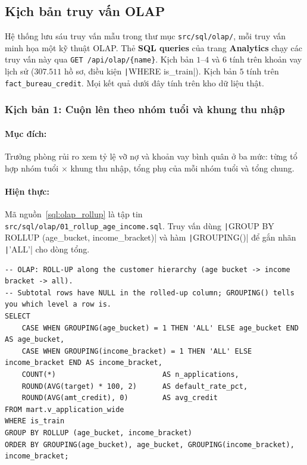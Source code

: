 \subsection{Kịch bản truy vấn OLAP}
\label{sec:olap-scenarios}
Hệ thống lưu sáu truy vấn mẫu trong thư mục \texttt{src/sql/olap/}, mỗi truy vấn minh họa một kỹ thuật OLAP. Thẻ \textbf{SQL queries} của trang \textbf{Analytics} chạy các truy vấn này qua \texttt{GET /api/olap/\{name\}}. Kịch bản $1$--$4$ và $6$ tính trên khoản vay lịch sử ($307.511$ hồ sơ, điều kiện \texttt|WHERE is_train|). Kịch bản $5$ tính trên \texttt{fact\_bureau\_credit}. Mọi kết quả dưới đây tính trên kho dữ liệu thật.

\subsubsection*{Kịch bản 1: Cuộn lên theo nhóm tuổi và khung thu nhập}
\paragraph{Mục đích:} Trưởng phòng rủi ro xem tỷ lệ vỡ nợ và khoản vay bình quân ở ba mức: từng tổ hợp nhóm tuổi $\times$ khung thu nhập, tổng phụ của mỗi nhóm tuổi và tổng chung.
\paragraph{Hiện thực:} Mã nguồn~\ref{sql:olap_rollup} là tập tin \texttt{src/sql/olap/}\allowbreak\texttt{01\_rollup\_age\_income.sql}. Truy vấn dùng \texttt|GROUP BY ROLLUP (age_bucket, income_bracket)| và hàm \texttt|GROUPING()| để gắn nhãn \texttt|'ALL'| cho dòng tổng.

\begin{listing}[H]
	\footnotesize
	\begin{verbatim}
-- OLAP: ROLL-UP along the customer hierarchy (age bucket -> income bracket -> all).
-- Subtotal rows have NULL in the rolled-up column; GROUPING() tells you which level a row is.
SELECT
    CASE WHEN GROUPING(age_bucket) = 1 THEN 'ALL' ELSE age_bucket END         AS age_bucket,
    CASE WHEN GROUPING(income_bracket) = 1 THEN 'ALL' ELSE income_bracket END AS income_bracket,
    COUNT(*)                         AS n_applications,
    ROUND(AVG(target) * 100, 2)      AS default_rate_pct,
    ROUND(AVG(amt_credit), 0)        AS avg_credit
FROM mart.v_application_wide
WHERE is_train
GROUP BY ROLLUP (age_bucket, income_bracket)
ORDER BY GROUPING(age_bucket), age_bucket, GROUPING(income_bracket), income_bracket;
\end{verbatim}
	\caption{Truy vấn cuộn lên theo nhóm tuổi và khung thu nhập}
	\label{sql:olap_rollup}
\end{listing}

